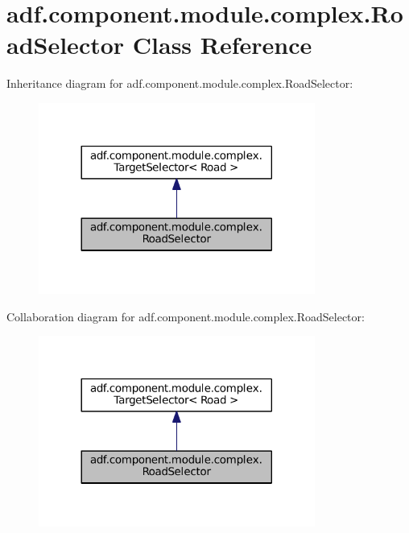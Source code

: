 \hypertarget{classadf_1_1component_1_1module_1_1complex_1_1RoadSelector}{}\section{adf.\+component.\+module.\+complex.\+Road\+Selector Class Reference}
\label{classadf_1_1component_1_1module_1_1complex_1_1RoadSelector}


Inheritance diagram for adf.\+component.\+module.\+complex.\+Road\+Selector\+:
\nopagebreak
\begin{figure}[H]
\begin{center}
\leavevmode
\includegraphics[width=257pt]{classadf_1_1component_1_1module_1_1complex_1_1RoadSelector__inherit__graph}
\end{center}
\end{figure}


Collaboration diagram for adf.\+component.\+module.\+complex.\+Road\+Selector\+:
\nopagebreak
\begin{figure}[H]
\begin{center}
\leavevmode
\includegraphics[width=257pt]{classadf_1_1component_1_1module_1_1complex_1_1RoadSelector__coll__graph}
\end{center}
\end{figure}
